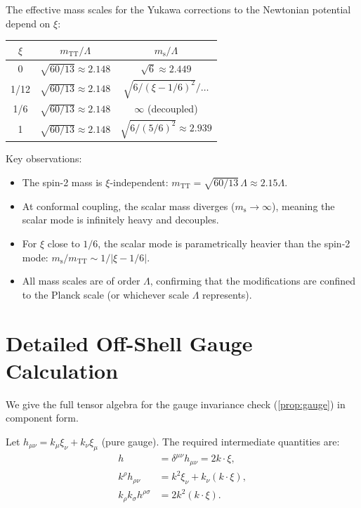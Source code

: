 \documentclass[11pt,a4paper]{article}
\theoremstyle{plain}
\theoremstyle{definition}
\begin{document}
The effective mass scales for the Yukawa corrections to the Newtonian
potential depend on $\xi$:

\begin{center}
\begin{tabular}{ccc}
\toprule
$\xi$ & $m_{\mathrm{TT}}/\Lambda$ & $m_{\mathrm{s}}/\Lambda$ \\
\midrule
0 & $\sqrt{60/13} \approx 2.148$ & $\sqrt{6} \approx 2.449$ \\
1/12 & $\sqrt{60/13} \approx 2.148$ & $\sqrt{6/(\xi-1/6)^2}/\ldots$ \\
1/6 & $\sqrt{60/13} \approx 2.148$ & $\infty$ (decoupled) \\
1 & $\sqrt{60/13} \approx 2.148$ & $\sqrt{6/(5/6)^2} \approx 2.939$ \\
\bottomrule
\end{tabular}
\end{center}

Key observations:
\begin{itemize}[nosep]
  \item The spin-2 mass is $\xi$-independent: $m_{\mathrm{TT}}
    = \sqrt{60/13}\,\Lambda \approx 2.15\Lambda$.
  \item At conformal coupling, the scalar mass diverges ($m_{\mathrm{s}}
    \to \infty$), meaning the scalar mode is infinitely heavy and
    decouples.
  \item For $\xi$ close to $1/6$, the scalar mode is
    parametrically heavier than the spin-2 mode:
    $m_{\mathrm{s}}/m_{\mathrm{TT}} \sim 1/|\xi - 1/6|$.
  \item All mass scales are of order $\Lambda$, confirming that
    the modifications are confined to the Planck scale (or whichever
    scale $\Lambda$ represents).
\end{itemize}

\section{Detailed Off-Shell Gauge Calculation}\label{app:gauge-detail}

We give the full tensor algebra for the gauge invariance check
(\cref{prop:gauge}) in component form.

Let $h_{\mu\nu} = k_\mu\xi_\nu + k_\nu\xi_\mu$ (pure gauge).
The required intermediate quantities are:
\begin{align}
  h &= \delta^{\mu\nu}h_{\mu\nu} = 2k \cdot \xi,\\
  k^\rho h_{\rho\nu} &= k^2 \xi_\nu + k_\nu(k \cdot \xi),\\
  k_\rho k_\sigma h^{\rho\sigma} &= 2k^2(k \cdot \xi).
\end{align}
\end{document}

